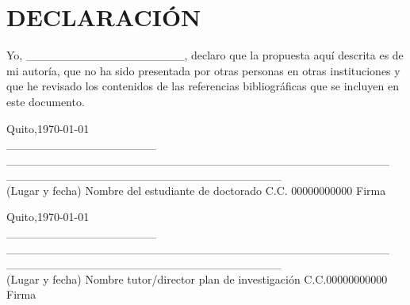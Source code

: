 \documentclass[a4paper,12pt]{article}
\begin{document}
\section*{DECLARACIÓN}

Yo, \_\_\_\_\_\_\_\_\_\_\_\_\_\_\_\_\_\_\_, declaro que la propuesta aquí descrita es de mi autoría, que no ha sido presentada por otras personas en otras instituciones y que he revisado los contenidos de las referencias bibliográficas que se incluyen en este documento.

\vspace{1cm}

\begin{flushleft}
	Quito,\today\\
	\_\_\_\_\_\_\_\_\_\_\_\_\_\_\_\_\_\_\hspace{0.1cm} \_\_\_\_\_\_\_\_\_\_\_\_\_\_\_\_\_\_\_\_\_\_\_\_\_\_\_\_\_\_\_\_\_\_\_\_\_\_\_\_\_\_\_\_\_\_  \hspace{0.3cm}\_\_\_\_\_\_\_\_\_\_\_\_\_\_\_\_\_\hspace{0.1cm}\_\_\_\_\_\_\_\_\_\_\_\_\_\_\_\_\\
	(Lugar y fecha) \hspace{0.2cm} Nombre del estudiante de doctorado \hspace{0.2cm} C.C.\hspace{0.05cm} 00000000000 \hspace{0.1cm} Firma \\
\end{flushleft}

\vspace{1cm}

\begin{flushleft}
	Quito,\today\\
	\_\_\_\_\_\_\_\_\_\_\_\_\_\_\_\_\_\_\hspace{0.1cm} \_\_\_\_\_\_\_\_\_\_\_\_\_\_\_\_\_\_\_\_\_\_\_\_\_\_\_\_\_\_\_\_\_\_\_\_\_\_\_\_\_\_\_\_\_\_  \hspace{0.3cm}\_\_\_\_\_\_\_\_\_\_\_\_\_\_\_\_\_\hspace{0.1cm}\_\_\_\_\_\_\_\_\_\_\_\_\_\_\_\_\\
	(Lugar y fecha) \hspace{0.0cm} Nombre tutor/director plan de investigación \hspace{0.1cm} C.C.\hspace{0.05cm}00000000000 \hspace{0.1cm} Firma \\
\end{flushleft}
\end{document}
